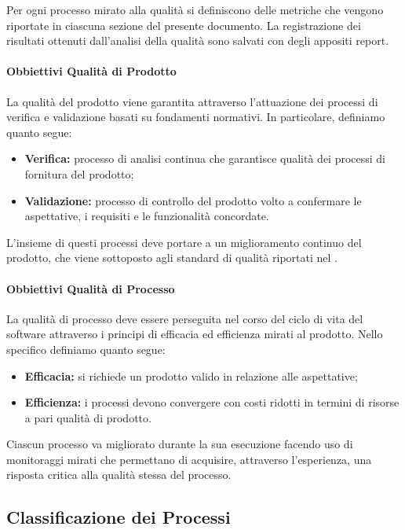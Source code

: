 	Per ogni processo mirato alla qualità si definiscono delle metriche che vengono riportate in ciascuna sezione del presente documento.
	La registrazione dei risultati ottenuti dall'analisi della qualità sono salvati con degli appositi report.

		\paragraph{Obbiettivi Qualità di Prodotto}

		La qualità del prodotto viene garantita attraverso l'attuazione dei processi di verifica e validazione basati su fondamenti normativi. In particolare, definiamo quanto segue:
		\begin{itemize}
			\item \textbf{Verifica:} processo di analisi continua che garantisce qualità dei processi di fornitura del prodotto;
			\item \textbf{Validazione:} processo di controllo del prodotto volto a confermare le aspettative, i requisiti e le funzionalità concordate.
		\end{itemize}

		L'insieme di questi processi deve portare a un miglioramento continuo del prodotto, che viene sottoposto agli standard di qualità riportati nel .

		\paragraph{Obbiettivi Qualità di Processo}

		La qualità di processo deve essere perseguita nel corso del ciclo di vita del software attraverso i principi di efficacia ed efficienza mirati al prodotto.
		Nello specifico definiamo quanto segue:
		\begin{itemize}
			\item \textbf{Efficacia:} si richiede un prodotto valido in relazione alle aspettative;
			\item \textbf{Efficienza:} i processi devono convergere con costi ridotti in termini di risorse a pari qualità di prodotto.
		\end{itemize}

		Ciascun processo va migliorato durante la sua esecuzione facendo uso di monitoraggi mirati che permettano di acquisire, attraverso l'esperienza, una risposta critica alla qualità stessa del processo. 


	\subsection{Classificazione dei Processi}

